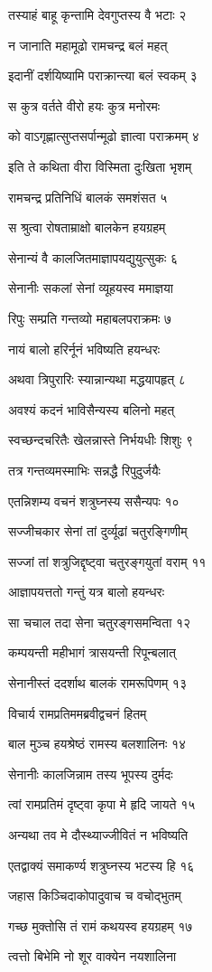 तस्याहं बाहू कृन्तामि देवगुप्तस्य वै भटाः २

न जानाति महामूढो रामचन्द्र बलं महत्

इदानीं दर्शयिष्यामि पराक्रान्त्या बलं स्वकम् ३

स कुत्र वर्तते वीरो हयः कुत्र मनोरमः

को वाऽगृह्णात्सुप्तसर्पान्मूढो ज्ञात्वा पराक्रमम् ४

इति ते कथिता वीरा विस्मिता दुःखिता भृशम्

रामचन्द्र प्रतिनिधिं बालकं समशंसत ५

स श्रुत्वा रोषताम्राक्षो बालकेन हयग्रहम्

सेनान्यं वै कालजितमाज्ञापयद्युयुत्सुकः ६

सेनानीः सकलां सेनां व्यूहयस्व ममाज्ञया

रिपुः सम्प्रति गन्तव्यो महाबलपराक्रमः ७

नायं बालो हरिर्नूनं भविष्यति हयन्धरः

अथवा त्रिपुरारिः स्यान्नान्यथा मद्धयापहृत् ८

अवश्यं कदनं भाविसैन्यस्य बलिनो महत्

स्वच्छन्दचरितैः खेलन्नास्ते निर्भयधीः शिशुः ९

तत्र गन्तव्यमस्माभिः सन्नद्धै रिपुदुर्जयैः

एतन्निशम्य वचनं शत्रुघ्नस्य ससैन्यपः १०

सज्जीचकार सेनां तां दुर्व्यूढां चतुरङ्गिणीम्

सज्जां तां शत्रुजिद्दृष्ट्वा चतुरङ्गयुतां वराम् ११

आज्ञापयत्ततो गन्तुं यत्र बालो हयन्धरः

सा चचाल तदा सेना चतुरङ्गसमन्विता १२

कम्पयन्ती महीभागं त्रासयन्ती रिपून्बलात्

सेनानीस्तं ददर्शाथ बालकं रामरूपिणम् १३

विचार्य रामप्रतिममब्रवीद्वचनं हितम्

बाल मुञ्च हयश्रेष्ठं रामस्य बलशालिनः १४

सेनानीः कालजिन्नाम तस्य भूपस्य दुर्मदः

त्वां रामप्रतिमं दृष्ट्वा कृपा मे हृदि जायते १५

अन्यथा तव मे दौस्थ्याज्जीवितं न भविष्यति

एतद्वाक्यं समाकर्ण्य शत्रुघ्नस्य भटस्य हि १६

जहास किञ्चिदाकोपादुवाच च वचोद्भुतम्

गच्छ मुक्तोसि तं रामं कथयस्व हयग्रहम् १७

त्वत्तो बिभेमि नो शूर वाक्येन नयशालिना

